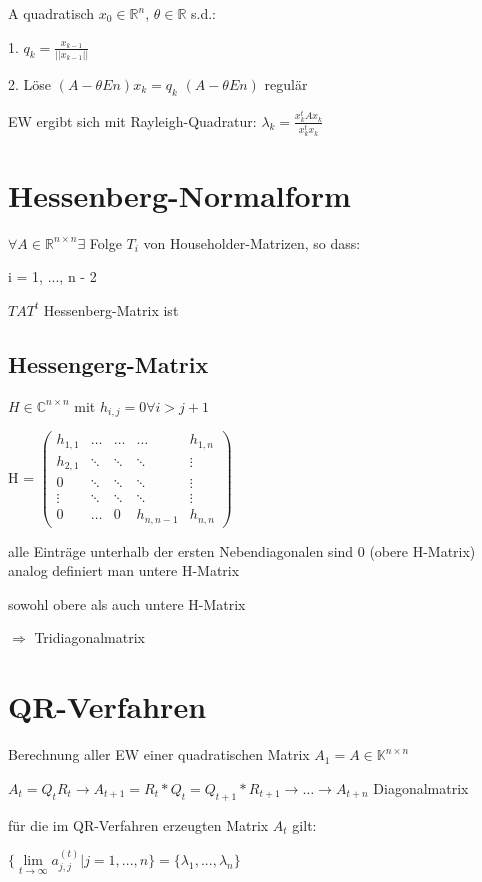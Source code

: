 \documentclass[12pt,a4paper]{article} %
\newcommand*\tab[1][1cm]{\hspace*{#1}}
\begin{document}
	A quadratisch $x_0 \in \mathbb{R}^{n}$, $\theta \in \mathbb{R}$ s.d.:
	
	1. $q_k = \frac{x_{k - 1}}{||x_{k - 1}||}$
	
	2. Löse $(A - \theta En)x_k = q_k$ \tab $(A - \theta En)$ regulär
	
	EW ergibt sich mit Rayleigh-Quadratur: $\lambda_k = \frac{x_k^t Ax_k}{x_k^t x_k}$
	
	\newpage
	
	\section{Hessenberg-Normalform}
	
	$\forall A \in \mathbb{R}^{n \times n} \exists$ Folge $T_i$ von Householder-Matrizen, so dass:
	
	i = 1, ..., n - 2
	
	$TAT^t$ Hessenberg-Matrix ist
	
	\subsection{Hessengerg-Matrix}
	
	$H \in \mathbb{C}^{n \times n}$ mit $h_{i, j} = 0 \forall i > j + 1$
	
	H =
	$\begin{pmatrix}
		h_{1, 1} & \dotsc & \dotsc & \dotsc & h_{1, n} \\
		h_{2, 1} & \ddots & \ddots & \ddots & \vdots   \\
		0        & \ddots & \ddots & \ddots & \vdots   \\
		\vdots   & \ddots & \ddots & \ddots & \vdots   \\
		0        & \dotsc & 0      & h_{n, n - 1} & h_{n, n}
	\end{pmatrix}$
	
	alle Einträge unterhalb der ersten Nebendiagonalen sind 0 (obere H-Matrix) analog definiert man untere H-Matrix
	
	sowohl obere als auch untere H-Matrix
	
	$\Rightarrow$ Tridiagonalmatrix
	
	\newpage
	
	\section{QR-Verfahren}
	
	Berechnung aller EW einer quadratischen Matrix $A_1 = A \in \mathbb{K}^{n \times n}$
	
	$A_t = Q_tR_t \rightarrow A_{t + 1} = R_t * Q_t = Q_{t + 1} * R_{t + 1} \rightarrow \dots \rightarrow A_{t + n}$ Diagonalmatrix
	
	für die im QR-Verfahren erzeugten Matrix $A_t$ gilt:
	
	$\{\lim\limits_{t \rightarrow \infty} a_{j, j}^{(t)} | j = 1, ..., n\} = \{\lambda_1, ..., \lambda_n\}$
	
\end{document}
